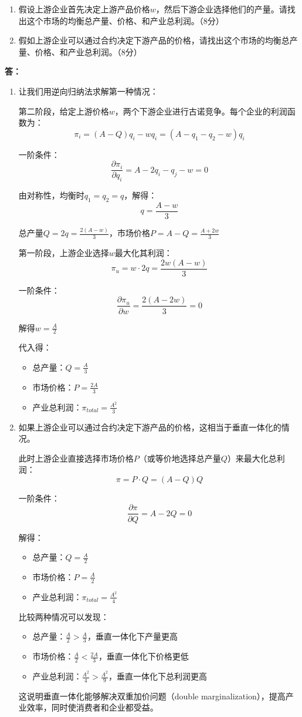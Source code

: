 \documentclass[12pt]{article}
\begin{document}
\begin{enumerate}
\item 假设上游企业首先决定上游产品价格$w$，然后下游企业选择他们的产量。请找出这个市场的均衡总产量、价格、和产业总利润。（8分）
\item 假如上游企业可以通过合约决定下游产品的价格，请找出这个市场的均衡总产量、价格、和产业总利润。（8分）
\end{enumerate}

\noindent\textbf{答：}
\begin{enumerate}
\item 让我们用逆向归纳法求解第一种情况：

第二阶段，给定上游价格$w$，两个下游企业进行古诺竞争。每个企业的利润函数为：
\[\pi_i=(A-Q)q_i-wq_i=(A-q_1-q_2-w)q_i\]

一阶条件：
\[\frac{\partial\pi_i}{\partial q_i}=A-2q_i-q_j-w=0\]

由对称性，均衡时$q_1=q_2=q$，解得：
\[q=\frac{A-w}{3}\]

总产量$Q=2q=\frac{2(A-w)}{3}$，市场价格$P=A-Q=\frac{A+2w}{3}$

第一阶段，上游企业选择$w$最大化其利润：
\[\pi_u=w\cdot2q=\frac{2w(A-w)}{3}\]

一阶条件：
\[\frac{\partial\pi_u}{\partial w}=\frac{2(A-2w)}{3}=0\]

解得$w=\frac{A}{2}$

代入得：
\begin{itemize}
\item 总产量：$Q=\frac{A}{3}$
\item 市场价格：$P=\frac{2A}{3}$
\item 产业总利润：$\pi_{total}=\frac{A^2}{3}$
\end{itemize}

\item 如果上游企业可以通过合约决定下游产品的价格，这相当于垂直一体化的情况。

此时上游企业直接选择市场价格$P$（或等价地选择总产量$Q$）来最大化总利润：
\[\pi=P\cdot Q=(A-Q)Q\]

一阶条件：
\[\frac{\partial\pi}{\partial Q}=A-2Q=0\]

解得：
\begin{itemize}
\item 总产量：$Q=\frac{A}{2}$
\item 市场价格：$P=\frac{A}{2}$
\item 产业总利润：$\pi_{total}=\frac{A^2}{4}$
\end{itemize}

比较两种情况可以发现：
\begin{itemize}
\item 总产量：$\frac{A}{2}>\frac{A}{3}$，垂直一体化下产量更高
\item 市场价格：$\frac{A}{2}<\frac{2A}{3}$，垂直一体化下价格更低
\item 产业总利润：$\frac{A^2}{4}>\frac{A^2}{9}$，垂直一体化下总利润更高
\end{itemize}

这说明垂直一体化能够解决双重加价问题（double marginalization），提高产业效率，同时使消费者和企业都受益。
\end{enumerate}
\end{document}
